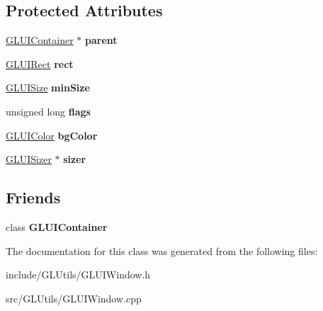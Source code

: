 \subsection*{Protected Attributes}
\begin{DoxyCompactItemize}
\item 
\hypertarget{classCartWheel_1_1GL_1_1GLUIWindow_ac576d567d040e107d8b55bab0c966b0f}{
\hyperlink{classCartWheel_1_1GL_1_1GLUIContainer}{GLUIContainer} $\ast$ {\bfseries parent}}
\label{classCartWheel_1_1GL_1_1GLUIWindow_ac576d567d040e107d8b55bab0c966b0f}

\item 
\hypertarget{classCartWheel_1_1GL_1_1GLUIWindow_a474e47dfb2abbf863f5d06c978321efe}{
\hyperlink{classCartWheel_1_1GL_1_1GLUIRect}{GLUIRect} {\bfseries rect}}
\label{classCartWheel_1_1GL_1_1GLUIWindow_a474e47dfb2abbf863f5d06c978321efe}

\item 
\hypertarget{classCartWheel_1_1GL_1_1GLUIWindow_af4221f541ca11211858e0c96f72f884c}{
\hyperlink{classCartWheel_1_1GL_1_1GLUISize}{GLUISize} {\bfseries minSize}}
\label{classCartWheel_1_1GL_1_1GLUIWindow_af4221f541ca11211858e0c96f72f884c}

\item 
\hypertarget{classCartWheel_1_1GL_1_1GLUIWindow_a7a0b857a68f12c87812c890f6a7600a6}{
unsigned long {\bfseries flags}}
\label{classCartWheel_1_1GL_1_1GLUIWindow_a7a0b857a68f12c87812c890f6a7600a6}

\item 
\hypertarget{classCartWheel_1_1GL_1_1GLUIWindow_a598db8c83614de0cb1abdf8b08fc7969}{
\hyperlink{classCartWheel_1_1GL_1_1GLUIColor}{GLUIColor} {\bfseries bgColor}}
\label{classCartWheel_1_1GL_1_1GLUIWindow_a598db8c83614de0cb1abdf8b08fc7969}

\item 
\hypertarget{classCartWheel_1_1GL_1_1GLUIWindow_a97c783f6ac9403735c4476a403631571}{
\hyperlink{classCartWheel_1_1GL_1_1GLUISizer}{GLUISizer} $\ast$ {\bfseries sizer}}
\label{classCartWheel_1_1GL_1_1GLUIWindow_a97c783f6ac9403735c4476a403631571}

\end{DoxyCompactItemize}
\subsection*{Friends}
\begin{DoxyCompactItemize}
\item 
\hypertarget{classCartWheel_1_1GL_1_1GLUIWindow_af41d51debb94796379d51476268d0d70}{
class {\bfseries GLUIContainer}}
\label{classCartWheel_1_1GL_1_1GLUIWindow_af41d51debb94796379d51476268d0d70}

\end{DoxyCompactItemize}


The documentation for this class was generated from the following files:\begin{DoxyCompactItemize}
\item 
include/GLUtils/GLUIWindow.h\item 
src/GLUtils/GLUIWindow.cpp\end{DoxyCompactItemize}
